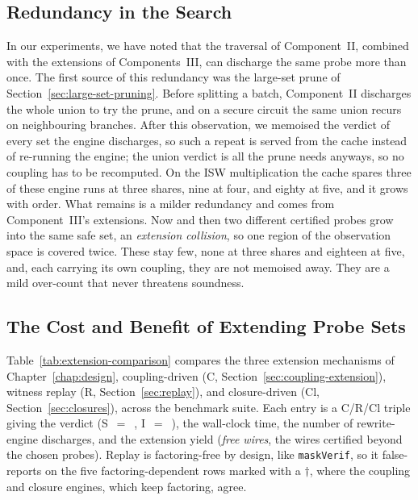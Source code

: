   \subsection{Redundancy in the Search}
  \label{sec:eval-redundancy}

  In our experiments, we have noted that the traversal of Component~II, combined with
  the extensions of Components~III, can discharge the same probe more than once.
  The first source of this redundancy was the large-set prune of
  Section~\ref{sec:large-set-pruning}. Before splitting a batch, Component~II
  discharges the whole union to try the prune, and on a secure circuit the same
  union recurs on neighbouring branches. After this observation, we memoised the verdict of every set the
  engine discharges, so such a repeat is served from the cache instead of re-running
  the engine; the union verdict is all the prune needs anyways, so no coupling has to be
  recomputed. On the ISW multiplication the cache spares three of these engine runs
  at three shares, nine at four, and eighty at five, and it grows with order. What
  remains is a milder redundancy and comes from Component~III's extensions. Now and then two
  different certified probes grow into the same safe set, an \emph{extension
  collision}, so one region of the observation space is covered twice. These stay
  few, none at three shares and eighteen at five, and, each carrying its own
  coupling, they are not memoised away. They are a mild over-count that never
  threatens soundness.

  \subsection{The Cost and Benefit of Extending Probe Sets}
  \label{sec:eval-extension}

  Table~\ref{tab:extension-comparison} compares the three extension mechanisms of
  Chapter~\ref{chap:design}, coupling-driven (C, Section~\ref{sec:coupling-extension}),
  witness replay (R, Section~\ref{sec:replay}), and closure-driven (Cl,
  Section~\ref{sec:closures}), across the benchmark suite. Each entry is a C/R/Cl
  triple giving the verdict (S~$=$~\Secure{}, I~$=$~\Insecure{}), the wall-clock
  time, the number of rewrite-engine discharges, and the extension yield (\emph{free
  wires}, the wires certified beyond the chosen probes). Replay is factoring-free by
  design, like \texttt{maskVerif}, so it false-reports \Insecure{} on the five
  factoring-dependent rows marked with a $\dagger$, where the coupling and closure engines,
  which keep factoring, agree.

